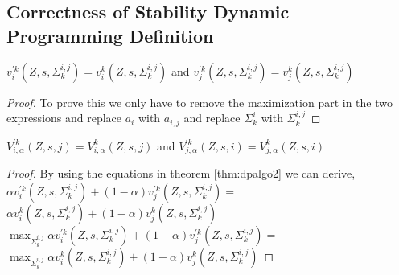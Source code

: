 \subsection{Correctness of Stability Dynamic Programming Definition }

\begin{theorem}
	\label{thm:dpalgo2}
	$v_i^{'k}(Z,s,\Sigma^{i,j}_k)=v_i^{k}(Z,s,\Sigma^{i,j}_k)$ and
	$v_j^{'k}(Z,s,\Sigma^{i,j}_k)=v_j^{k}(Z,s,\Sigma^{i,j}_k)$
\end{theorem}

\begin{proof}
	To prove this we only have to remove the maximization part in the two expressions and replace $a_i$ with $a_{i,j}$ and replace $\Sigma^i_k$ with $\Sigma^{i,j}_k$ 
\end{proof}

\begin{theorem}
	\label{thm:dpalgo2}
	$V_{i,\alpha}^{'k}(Z,s,j)=V_{i,\alpha}^{k}(Z,s,j)$ and
	$V_{j,\alpha}^{'k}(Z,s,i)=V_{j,\alpha}^{k}(Z,s,i)$
\end{theorem}

\begin{proof}
	By using the equations in theorem \ref{thm:dpalgo2} we can derive,\\
	$\alpha v_i^{'k}(Z,s,\Sigma^{i,j}_k) + (1-\alpha)v_j^{'k}(Z,s,\Sigma^{i,j}_k)=$
	$\alpha v_i^{k}(Z,s,\Sigma^{i,j}_k) + (1-\alpha)v_j^{k}(Z,s,\Sigma^{i,j}_k) $\\
	$\max_{\Sigma^{i,j}_k} \alpha v_i^{'k}(Z,s,\Sigma^{i,j}_k) + (1-\alpha)v_j^{'k}(Z,s,\Sigma^{i,j}_k)=$
	$\max_{\Sigma^{i,j}_k}\alpha v_i^{k}(Z,s,\Sigma^{i,j}_k) + (1-\alpha)v_j^{k}(Z,s,\Sigma^{i,j}_k) $
\end{proof}


